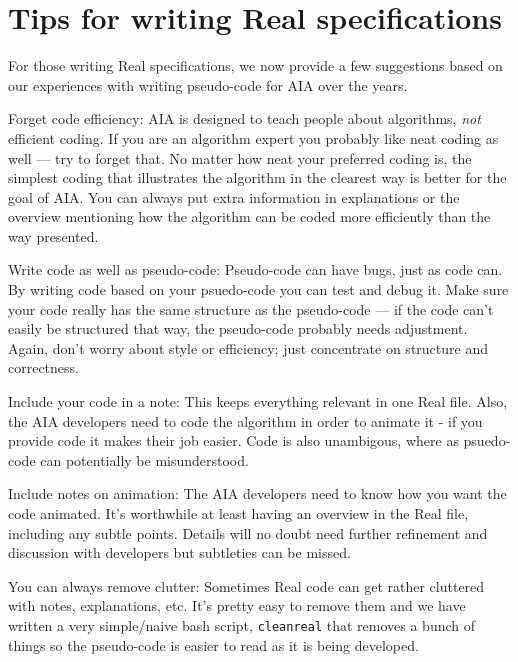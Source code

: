 \documentclass[11pt]{article}
\begin{document}
\section{Tips for writing Real specifications}

For those writing Real specifications, we now provide a few suggestions
based on our experiences with writing pseudo-code for AIA over the
years.

\begin{description}
\item{Forget code efficiency:}
AIA is designed to teach people about algorithms, \emph{not} efficient
coding.  If you are an algorithm expert you probably like neat coding as
well --- try to forget that. No matter how neat your preferred coding is,
the simplest coding that illustrates the algorithm in the clearest way
is better for the goal of AIA.  You can always put extra information in
explanations or the overview mentioning how the algorithm can be coded
more efficiently than the way presented.

\item{Write code as well as pseudo-code:}
Pseudo-code can have bugs, just as code can. By writing code based on
your psuedo-code you can test and debug it. Make sure your code
really has the same structure as the pseudo-code --- if the code can't
easily be structured that way, the pseudo-code probably needs adjustment.
Again, don't worry about style or efficiency; just concentrate on structure
and correctness.

\item{Include your code in a note:}
This keeps everything relevant in one Real file.  Also, the AIA
developers need to code the algorithm in order to animate it - if you
provide code it makes their job easier.  Code is also unambigous, where
as psuedo-code can potentially be misunderstood. 

\item{Include notes on animation:}
The AIA developers need to know how you want the code animated.
It's worthwhile at least having an overview in the Real file, including
any subtle points.  Details will no doubt need further refinement and
discussion with developers but subtleties can be missed.

\item{You can always remove clutter:}
Sometimes Real code can get rather cluttered with notes, explanations,
etc. It's pretty easy to remove them and we have written a very
simple/naive bash script, \texttt{cleanreal} that removes a bunch of
things so the pseudo-code is easier to read as it is being developed.


\end{description}
\end{document}
